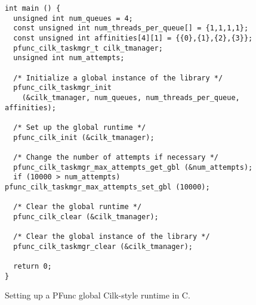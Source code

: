 \begin{figure}
\begin{center}
\begin{minipage}{0.75\textwidth}
\begin{lstlisting}[frame=lrtb]
int main () {
  unsigned int num_queues = 4;
  const unsigned int num_threads_per_queue[] = {1,1,1,1};
  const unsigned int affinities[4][1] = {{0},{1},{2},{3}};
  pfunc_cilk_taskmgr_t cilk_tmanager;
  unsigned int num_attempts;

  /* Initialize a global instance of the library */
  pfunc_cilk_taskmgr_init 
    (&cilk_tmanager, num_queues, num_threads_per_queue, affinities);

  /* Set up the global runtime */
  pfunc_cilk_init (&cilk_tmanager);

  /* Change the number of attempts if necessary */
  pfunc_cilk_taskmgr_max_attempts_get_gbl (&num_attempts);
  if (10000 > num_attempts) pfunc_cilk_taskmgr_max_attempts_set_gbl (10000);

  /* Clear the global runtime */
  pfunc_cilk_clear (&cilk_tmanager);

  /* Clear the global instance of the library */
  pfunc_cilk_taskmgr_clear (&cilk_tmanager);

  return 0;
}
\end{lstlisting}
\end{minipage}
\end{center}
\caption{Setting up a PFunc global Cilk-style runtime in C.}
\label{fig:c_global}
\end{figure}
